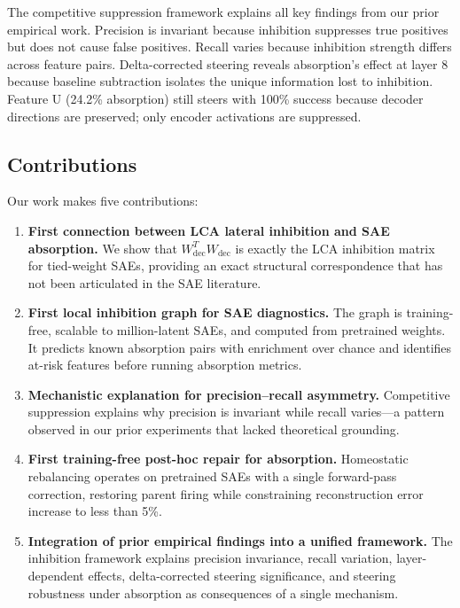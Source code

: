 \documentclass{article}
\begin{document}
The competitive suppression framework explains all key findings from our prior empirical work. Precision is invariant because inhibition suppresses true positives but does not cause false positives. Recall varies because inhibition strength differs across feature pairs. Delta-corrected steering reveals absorption's effect at layer 8 because baseline subtraction isolates the unique information lost to inhibition. Feature U (24.2\% absorption) still steers with 100\% success because decoder directions are preserved; only encoder activations are suppressed.

\subsection{Contributions}

Our work makes five contributions:

\begin{enumerate}
    \item \textbf{First connection between LCA lateral inhibition and SAE absorption.} We show that $W_{\text{dec}}^T W_{\text{dec}}$ is exactly the LCA inhibition matrix for tied-weight SAEs, providing an exact structural correspondence that has not been articulated in the SAE literature.

    \item \textbf{First local inhibition graph for SAE diagnostics.} The graph is training-free, scalable to million-latent SAEs, and computed from pretrained weights. It predicts known absorption pairs with enrichment over chance and identifies at-risk features before running absorption metrics.

    \item \textbf{Mechanistic explanation for precision--recall asymmetry.} Competitive suppression explains why precision is invariant while recall varies---a pattern observed in our prior experiments that lacked theoretical grounding.

    \item \textbf{First training-free post-hoc repair for absorption.} Homeostatic rebalancing operates on pretrained SAEs with a single forward-pass correction, restoring parent firing while constraining reconstruction error increase to less than 5\%.

    \item \textbf{Integration of prior empirical findings into a unified framework.} The inhibition framework explains precision invariance, recall variation, layer-dependent effects, delta-corrected steering significance, and steering robustness under absorption as consequences of a single mechanism.
\end{enumerate}
\end{document}
